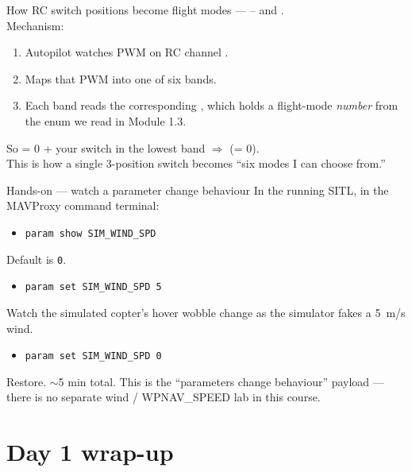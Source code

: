 \documentclass[aspectratio=169,11pt]{beamer}
\begin{document}
\begin{frame}{How RC switch positions become flight modes}
   --- -- and .\\[1ex]
  Mechanism:
  \begin{enumerate}
    \item Autopilot watches PWM on RC channel .
    \item Maps that PWM into one of six bands.
    \item Each band reads the corresponding , which holds a flight-mode \emph{number} from the enum we read in Module 1.3.
  \end{enumerate}
  So  = 0 + your switch in the lowest band $\Rightarrow$  (= 0).\\[1ex]
  This is how a single 3-position switch becomes ``six modes I can choose from.''
\end{frame}

\begin{frame}{Hands-on --- watch a parameter change behaviour}
  In the running SITL, in the MAVProxy command terminal:
  \begin{itemize}
    \item[\texttt{>}] \texttt{param show SIM\_WIND\_SPD}
  \end{itemize}
  Default is \texttt{0}.
  \begin{itemize}
    \item[\texttt{>}] \texttt{param set SIM\_WIND\_SPD 5}
  \end{itemize}
  Watch the simulated copter's hover wobble change as the simulator fakes a 5~m/s wind.
  \begin{itemize}
    \item[\texttt{>}] \texttt{param set SIM\_WIND\_SPD 0}
  \end{itemize}
  Restore. $\sim$5 min total.
  \vfill
  This is the ``parameters change behaviour'' payload --- there is no separate wind / WPNAV\_SPEED lab in this course.
\end{frame}

\section{Day 1 wrap-up}
\end{document}
